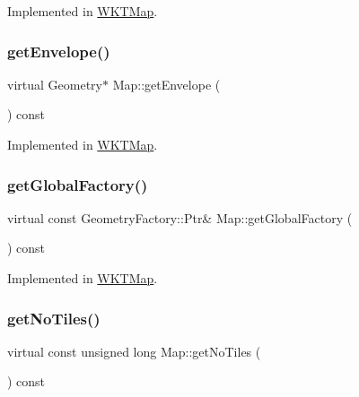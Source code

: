 Implemented in \hyperlink{class_w_k_t_map_a0b326822ab1bcfc0765e97f3acb545b0}{W\+K\+T\+Map}.

\mbox{\label{class_map_a40854af632e83500ca5b44180eae8e87}} 
\subsubsection{\texorpdfstring{get\+Envelope()}{getEnvelope()}}
{\footnotesize\ttfamily virtual Geometry$\ast$ Map\+::get\+Envelope (\begin{DoxyParamCaption}{ }\end{DoxyParamCaption}) const\hspace{0.3cm}{\ttfamily [pure virtual]}}



Implemented in \hyperlink{class_w_k_t_map_af117af8392fc33f1e603f10ea57ac6b0}{W\+K\+T\+Map}.

\mbox{\label{class_map_ab4dd1529d5c9ba2232108a2de2095b76}} 
\subsubsection{\texorpdfstring{get\+Global\+Factory()}{getGlobalFactory()}}
{\footnotesize\ttfamily virtual const Geometry\+Factory\+::\+Ptr\& Map\+::get\+Global\+Factory (\begin{DoxyParamCaption}{ }\end{DoxyParamCaption}) const\hspace{0.3cm}{\ttfamily [pure virtual]}}



Implemented in \hyperlink{class_w_k_t_map_a566b85bafc53e2013e0a21d4a387ce91}{W\+K\+T\+Map}.

\mbox{\label{class_map_a89abf4b20e4b0e54b706452e5caa61b3}} 
\subsubsection{\texorpdfstring{get\+No\+Tiles()}{getNoTiles()}}
{\footnotesize\ttfamily virtual const unsigned long Map\+::get\+No\+Tiles (\begin{DoxyParamCaption}{ }\end{DoxyParamCaption}) const\hspace{0.3cm}{\ttfamily [virtual]}}

